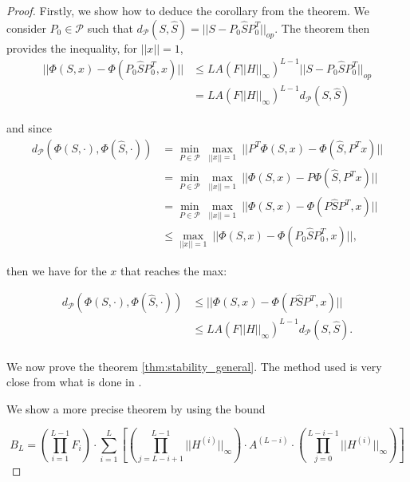 \documentclass[11pt,a4paper]{article}
\newcommand{\cP}{\mathcal{P}}
\newcommand{\op}[1]{|| #1 ||_{op}}
\newcommand{\ninf}[1]{|| #1 ||_\infty}
\newcommand{\Sum}[2]{\overset{#2}{\underset{#1}{\sum}}}
\theoremstyle{definition}
\renewcommand{\leq}{\leqslant}
\begin{document}
        \begin{proof}   
            Firstly, we show how to deduce the corollary from the theorem. We consider $P_0 \in \cP$ such that $d_\cP(S,\hat{S})=||S- P_0 \hat{S} P_0^T ||_{op}$. The theorem then provides the inequality, for $||x||=1$,
            \begin{align*}
                || \Phi (S,x) - \Phi (P_0 \hat{S} P_0^T,x) || &\leq L A (F \ninf{H} )^ {L-1} \op{S - P_0 \hat{S} P_0^T} \\
                &= L A (F \ninf{H} )^ {L-1} d_\cP(S,\hat{S})
            \end{align*}

            and since 
            \begin{align*}
                d_\cP(\Phi(S,\cdot),\Phi(\hat{S},\cdot)) &= \underset{P \in \cP}{\min} \ \underset{||x|| = 1}{\max} \ || P^T \Phi (S,x) - \Phi(\hat{S}, P^T x) || \\
                &= \underset{P \in \cP}{\min} \ \underset{||x|| = 1}{\max} \ ||\Phi (S,x) - P \Phi(\hat{S}, P^T x) || \\
                &= \underset{P \in \cP}{\min} \ \underset{||x|| = 1}{\max} \ ||\Phi (S,x) - \Phi(P \hat{S} P^T, x) || \\
                &\leq \underset{||x|| = 1}{\max} \ ||\Phi (S,x) - \Phi(P_0 \hat{S} P_0^T, x) ||,
            \end{align*}

            then we have for the $x$ that reaches the max:

            \begin{align*}
                d_\cP(\Phi(S,\cdot),\Phi(\hat{S},\cdot)) &\leq || \Phi (S,x) - \Phi (P \hat{S} P^T,x) || \\
                &\leq  L A (F \ninf{H} )^ {L-1} d_\cP(S,\hat{S}).
            \end{align*}\\

            We now prove the theorem \ref{thm:stability_general}. The method used is very close from what is done in .
            
            We show a more precise theorem by using the bound 
            
            $$B_L = \left( \underset{i=1}{\overset{L-1}{\prod}} F_i \right)  \cdot \Sum{i=1}{L} \left[ (\underset{j=L-i+1}{\overset{L-1}{\prod}} \ninf{H ^{(i)}}) \cdot A^{(L-i)} \cdot (\underset{j=0}{\overset{L-i-1}{\prod}} \ninf{H ^{(i)}}) \right] $$
            

\end{proof}
\end{document}
